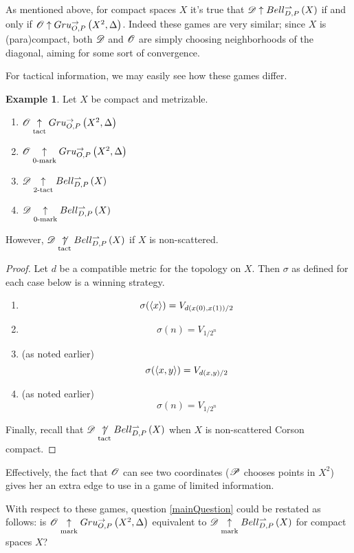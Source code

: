 \documentclass{amsart}
\theoremstyle{definition}
\newtheorem{example}[theorem]{Example}
\begin{document}
  As mentioned above, for compact spaces \(X\) it's true that
  \(\mathscr{D}\uparrow Bell_{D,P}^{\rightharpoonup}\left({X}\right)\) if and only if
  \(\mathscr{O}\uparrow Gru_{O,P}^{\to}\left({X^2},{\Delta}\right)\). Indeed these games are very similar;
  since \(X\) is (para)compact, both \(\mathscr{D}\) and \(\mathscr{O}\) are simply
  choosing neighborhoods of the diagonal, aiming for some sort of convergence.

  For tactical information, we may easily see how
  these games differ.

  \begin{example}
    Let \(X\) be compact and metrizable.
      \begin{enumerate}
        \item
          \(\mathscr{O}\underset{\text{tact}}{\uparrow}Gru_{O,P}^{\to}\left({X^2},{\Delta}\right)\)
        \item
          \(\mathscr{O}\underset{0\text{-mark}}{\uparrow}Gru_{O,P}^{\to}\left({X^2},{\Delta}\right)\)
        \item
          \(\mathscr{D}\underset{2\text{-tact}}{\uparrow}Bell_{D,P}^{\rightharpoonup}\left({X}\right)\)
        \item
          \(\mathscr{D}\underset{0\text{-mark}}{\uparrow}Bell_{D,P}^{\rightharpoonup}\left({X}\right)\)
      \end{enumerate}
    However, \(\mathscr{D}\underset{\text{tact}}{\not\uparrow}Bell_{D,P}^{\rightharpoonup}\left({X}\right)\) if \(X\) is non-scattered.
  \end{example}

  \begin{proof}
    Let \(d\) be a compatible metric for the topology on \(X\).
    Then \(\sigma\) as defined for each case below is a winning strategy.
    \begin{enumerate}
      \item
        \[
          \sigma(\langle x\rangle)
            =
          V_{d(x(0),x(1))/2}
        \]
      \item
        \[
          \sigma(n)
            =
          V_{1/2^n}
        \]
      \item (as noted earlier)
        \[
          \sigma(\langle x,y\rangle)
            =
          V_{d(x,y)/2}
        \]
      \item (as noted earlier)
        \[
          \sigma(n)
            =
          V_{1/2^n}
        \]
    \end{enumerate}
    Finally, recall that \(\mathscr{D}\underset{\text{tact}}{\not\uparrow}Bell_{D,P}^{\rightharpoonup}\left({X}\right)\)
    when \(X\) is non-scattered Corson compact.
  \end{proof}

  Effectively, the fact that \(\mathscr{O}\) can see two coordinates (\(\mathscr{P}\)
  chooses points in \(X^2\)) gives her an extra edge to use in a game
  of limited information.

  With respect to these games,
  question \ref{mainQuestion} could be restated as follows:
  is \(\mathscr{O}\underset{\text{mark}}{\uparrow}Gru_{O,P}^{\to}\left({X^2},{\Delta}\right)\) equivalent to
  \(\mathscr{D}\underset{\text{mark}}{\uparrow}Bell_{D,P}^{\rightharpoonup}\left({X}\right)\) for compact spaces \(X\)?




\end{document}
